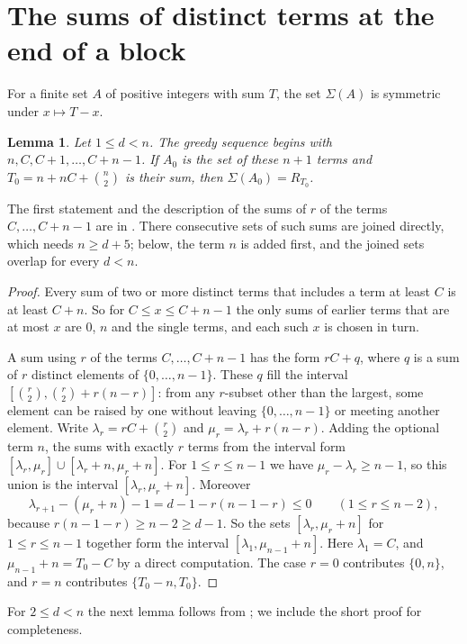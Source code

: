 \documentclass[11pt]{article}
\newtheorem{lemma}[theorem]{Lemma}
\theoremstyle{remark}
\begin{document}
\section{The sums of distinct terms at the end of a block}

For a finite set $A$ of positive integers with sum $T$, the set $\Sigma(A)$ is symmetric under $x\mapsto T-x$.

\begin{lemma}\label{lem:start}
Let $1\le d<n$. The greedy sequence begins with $n,C,C+1,\dots,C+n-1$. If $A_0$ is the set of these $n+1$ terms and
$T_0=n+nC+\binom n2$ is their sum, then $\Sigma(A_0)=R_{T_0}$.
\end{lemma}

The first statement and the description of the sums of $r$ of the terms $C,\dots,C+n-1$ are in
\cite[Section~3]{FK}. There consecutive sets of such sums are joined directly, which needs $n\ge d+5$; below, the
term $n$ is added first, and the joined sets overlap for every $d<n$.

\begin{proof}
Every sum of two or more distinct terms that includes a term at least $C$ is at least $C+n$. So for $C\le x\le
C+n-1$ the only sums of earlier terms that are at most $x$ are $0$, $n$ and the single terms, and each such $x$ is
chosen in turn.

A sum using $r$ of the terms $C,\dots,C+n-1$ has the form $rC+q$, where $q$ is a sum of $r$ distinct elements of
$\{0,\dots,n-1\}$. These $q$ fill the interval $[\binom r2,\binom r2+r(n-r)]$: from any $r$-subset other than the
largest, some element can be raised by one without leaving $\{0,\dots,n-1\}$ or meeting another element. Write
$\lambda_r=rC+\binom r2$ and $\mu_r=\lambda_r+r(n-r)$. Adding the optional term $n$, the sums with exactly $r$ terms from the interval
form $[\lambda_r,\mu_r]\cup[\lambda_r+n,\mu_r+n]$. For $1\le r\le n-1$ we have $\mu_r-\lambda_r\ge n-1$, so this union is the interval
$[\lambda_r,\mu_r+n]$. Moreover
\[
\lambda_{r+1}-(\mu_r+n)-1=d-1-r(n-1-r)\le 0\qquad(1\le r\le n-2),
\]
because $r(n-1-r)\ge n-2\ge d-1$. So the sets $[\lambda_r,\mu_r+n]$ for $1\le r\le n-1$ together form the interval $[\lambda_1,\mu_{n-1}+n]$. Here
$\lambda_1=C$, and $\mu_{n-1}+n=T_0-C$ by a direct computation. The case $r=0$ contributes $\{0,n\}$, and $r=n$ contributes
$\{T_0-n,T_0\}$.
\end{proof}

For $2\le d<n$ the next lemma follows from \cite[Lemma~2]{FK}; we include the short proof for completeness.
\end{document}
